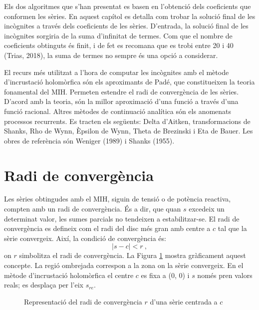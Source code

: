 
Els dos algoritmes que s'han presentat es basen en l'obtenció dels coeficients que conformen les sèries. En aquest capítol es detalla com trobar la solució final de les incògnites a través dels coeficients de les sèries. D'entrada, la solució final de les incògnites sorgiria de la suma d'infinitat de termes. Com que el nombre de coeficients obtinguts és finit, i de fet es recomana que es trobi entre 20 i 40 (Trias, 2018), la suma de termes no sempre és una opció a considerar.

El recurs més utilitzat a l'hora de computar les incògnites amb el mètode d'incrustació holomòrfica són els aproximants de Padé, que constitueixen la teoria fonamental del MIH. Permeten estendre el radi de convergència de les sèries. D'acord amb la teoria, són la millor aproximació d'una funció a través d'una funció racional. Altres mètodes de continuació analítica són els anomenats processos recurrents. Es tracten els següents: Delta d'Aitken, transformacions de Shanks, Rho de Wynn, Èpsilon de Wynn, Theta de Brezinski i Eta de Bauer. Les obres de referència són Weniger (1989) i Shanks (1955).

\section{Radi de convergència}
Les sèries obtingudes amb el MIH, siguin de tensió o de potència reactiva, compten amb un radi de convergència. És a dir, que quan $s$ excedeix un determinat valor, les sumes parcials no tendeixen a estabilitzar-se. El radi de convergència es defineix com el radi del disc més gran amb centre a $c$ tal que la sèrie convergeix. Així, la condició de convergència és:
\begin{equation}
    |s-c| < r\ ,
    \label{eq:converg1}
\end{equation}
on $r$ simbolitza el radi de convergència. La Figura \ref{fig:radigrafic} mostra gràficament aquest concepte. La regió ombrejada correspon a la zona on la sèrie convergeix. En el mètode d'incrustació holomòrfica el centre $c$ es fixa a (0, 0) i $s$ només pren valors reals; es desplaça per l'eix $s_{re}$.

\begin{figure}[!ht] \footnotesize
    \begin{center}
    \caption{Representació del radi de convergència $r$ d'una sèrie centrada a $c$}
    \label{fig:radigrafic}
    \end{center}
\end{figure}

